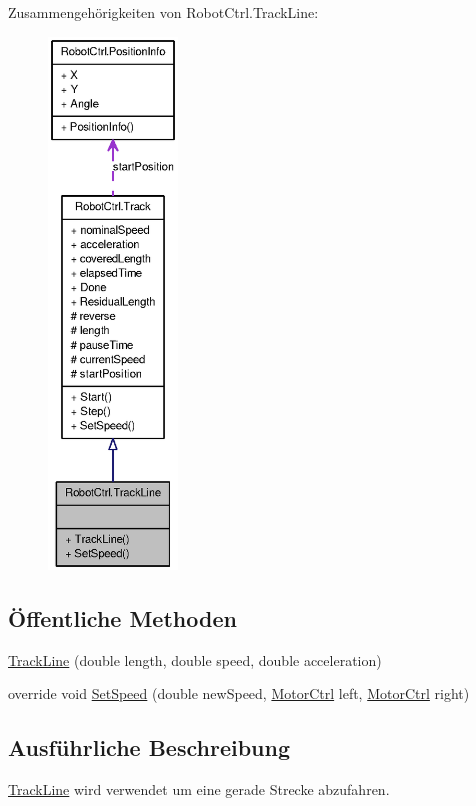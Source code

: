 Zusammengehörigkeiten von RobotCtrl.TrackLine:\nopagebreak
\begin{figure}[H]
\begin{center}
\leavevmode
\includegraphics[height=400pt]{class_robot_ctrl_1_1_track_line__coll__graph}
\end{center}
\end{figure}
\subsection*{Öffentliche Methoden}
\begin{DoxyCompactItemize}
\item 
\hyperlink{class_robot_ctrl_1_1_track_line_ab4ab93433f36792a4748322b94febfc7}{TrackLine} (double length, double speed, double acceleration)
\item 
override void \hyperlink{class_robot_ctrl_1_1_track_line_ad73ae0e8f7aea1765834ab90f5bd6b23}{SetSpeed} (double newSpeed, \hyperlink{class_robot_ctrl_1_1_motor_ctrl}{MotorCtrl} left, \hyperlink{class_robot_ctrl_1_1_motor_ctrl}{MotorCtrl} right)
\end{DoxyCompactItemize}


\subsection{Ausführliche Beschreibung}
\hyperlink{class_robot_ctrl_1_1_track_line}{TrackLine} wird verwendet um eine gerade Strecke abzufahren. 

